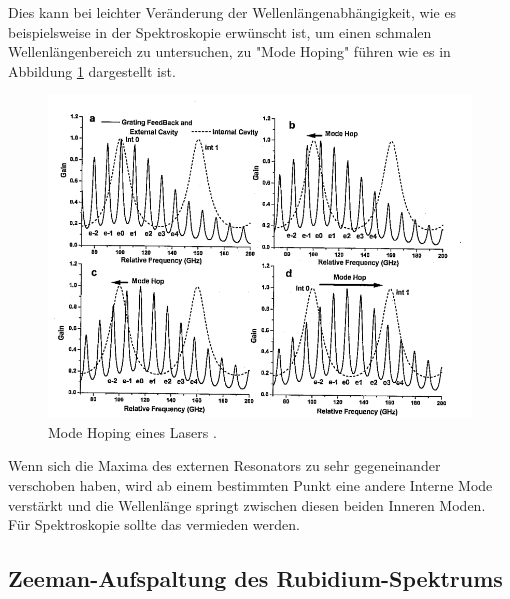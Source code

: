 Dies kann bei leichter Veränderung der Wellenlängenabhängigkeit, wie es beispielsweise in der Spektroskopie erwünscht ist, um einen schmalen 
Wellenlängenbereich zu untersuchen, zu "Mode Hoping" führen wie es in Abbildung \ref{fig:Moden2} dargestellt ist.
\begin{figure}[H]
    \centering
    \includegraphics[scale=0.8]{pictures/Moden2.png}
    \caption{Mode Hoping eines Lasers \cite{teachspin}.}
    \label{fig:Moden2}
\end{figure}
\noindent Wenn sich die Maxima des externen Resonators zu sehr gegeneinander verschoben haben, wird ab einem bestimmten Punkt eine andere Interne Mode verstärkt und 
die Wellenlänge springt zwischen diesen beiden Inneren Moden. Für Spektroskopie sollte das vermieden werden.
\subsection{Zeeman-Aufspaltung des Rubidium-Spektrums}


